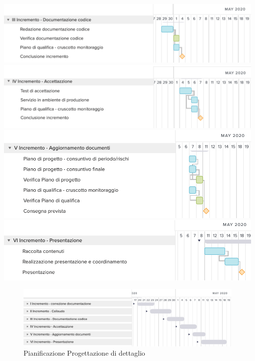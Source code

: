 	\includegraphics[width=\textwidth]{res/img/gantt/RA/3}
	\includegraphics[width=\textwidth]{res/img/gantt/RA/4}
	\includegraphics[width=\textwidth]{res/img/gantt/RA/5}
	\includegraphics[width=\textwidth]{res/img/gantt/RA/6}
\begin{figure}[h!]
	\includegraphics[width=\textwidth]{res/img/gantt/RA/f}
	\caption{Pianificazione Progettazione di dettaglio}
\end{figure}
